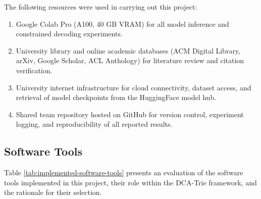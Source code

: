 The following resources were used in carrying out this project:

\begin{enumerate}[label=\roman*.]
  \item Google Colab Pro (A100, 40 GB VRAM) for all model inference and constrained decoding experiments.
  \item University library and online academic databases (ACM Digital Library, arXiv, Google Scholar, ACL Anthology) for literature review and citation verification.
  \item University internet infrastructure for cloud connectivity, dataset access, and retrieval of model checkpoints from the HuggingFace model hub.
  \item Shared team repository hosted on GitHub for version control, experiment logging, and reproducibility of all reported results.
\end{enumerate}


\subsection{Software Tools}

Table \ref{tab:implemented-software-tools} presents an evaluation of the software tools implemented in this project, their role within the DCA-Trie framework, and the rationale for their selection.

